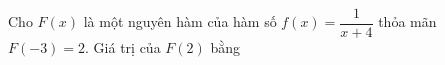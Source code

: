 \begin{ex}
Cho $F(x)$ là một nguyên hàm của hàm số $f(x)=\dfrac{1}{x+4}$ thỏa mãn $F(-3)=2$. Giá trị của $F(2)$ bằng
\end{ex}
